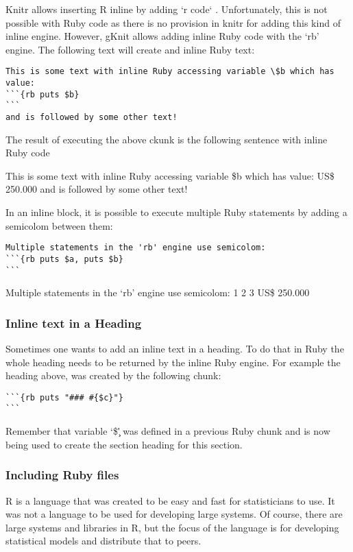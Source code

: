 \documentclass[]{article}
\begin{document}
Knitr allows inserting R inline by adding `r code` . Unfortunately, this
is not possible with Ruby code as there is no provision in knitr for
adding this kind of inline engine. However, gKnit allows adding inline
Ruby code with the `rb' engine. The following text will create and
inline Ruby text:

\begin{verbatim}
This is some text with inline Ruby accessing variable \$b which has value:
```{rb puts $b}
```
and is followed by some other text!
\end{verbatim}

The result of executing the above ckunk is the following sentence with
inline Ruby code

This is some text with inline Ruby accessing variable \$b which has
value: US\$ 250.000 and is followed by some other text!

In an inline block, it is possible to execute multiple Ruby statements
by adding a semicolom between them:

\begin{verbatim}
Multiple statements in the 'rb' engine use semicolom:
```{rb puts $a, puts $b}
```
\end{verbatim}

Multiple statements in the `rb' engine use semicolom: 1 2 3 US\$ 250.000

\subsubsection{Inline text in a Heading}\label{inline-text-in-a-heading}

Sometimes one wants to add an inline text in a heading. To do that in
Ruby the whole heading needs to be returned by the inline Ruby engine.
For example the heading above, was created by the following chunk:

\begin{verbatim}
```{rb puts "### #{$c}"}
```
\end{verbatim}

Remember that variable `\$\c' was defined in a previous Ruby chunk and
is now being used to create the section heading for this section.

\subsubsection{Including Ruby files}\label{including-ruby-files}

R is a language that was created to be easy and fast for statisticians
to use. It was not a language to be used for developing large systems.
Of course, there are large systems and libraries in R, but the focus of
the language is for developing statistical models and distribute that to
peers.
\end{document}
